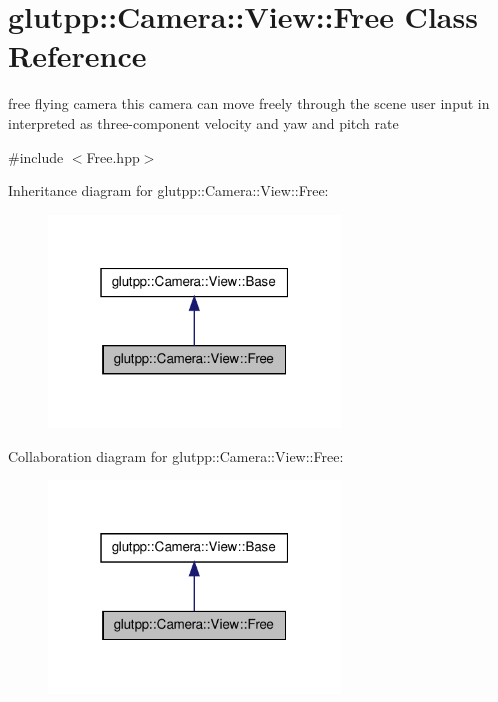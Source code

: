 \hypertarget{classglutpp_1_1Camera_1_1View_1_1Free}{\section{glutpp\-:\-:\-Camera\-:\-:\-View\-:\-:\-Free \-Class \-Reference}
\label{classglutpp_1_1Camera_1_1View_1_1Free}
}


free flying camera this camera can move freely through the scene user input in interpreted as three-\/component velocity and yaw and pitch rate  




{\ttfamily \#include $<$\-Free.\-hpp$>$}



\-Inheritance diagram for glutpp\-:\-:\-Camera\-:\-:\-View\-:\-:\-Free\-:\nopagebreak
\begin{figure}[H]
\begin{center}
\leavevmode
\includegraphics[width=220pt]{classglutpp_1_1Camera_1_1View_1_1Free__inherit__graph}
\end{center}
\end{figure}


\-Collaboration diagram for glutpp\-:\-:\-Camera\-:\-:\-View\-:\-:\-Free\-:\nopagebreak
\begin{figure}[H]
\begin{center}
\leavevmode
\includegraphics[width=220pt]{classglutpp_1_1Camera_1_1View_1_1Free__coll__graph}
\end{center}
\end{figure}
